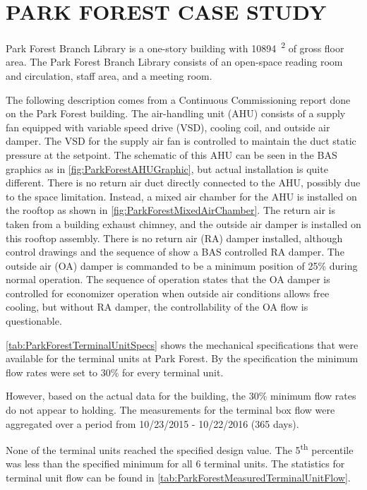 \chapter{\texorpdfstring{\MakeUppercase{Park Forest Case Study}}{Park Forest Case Study}}

Park Forest Branch Library is a one-story building with
\SI{10894}{\feet\squared} of gross floor area. The Park Forest Branch
Library consists of an open-space reading room and circulation, staff
area, and a meeting room.

The following description comes from a Continuous Commissioning report
done on the Park Forest building. The air-handling unit (AHU) consists
of a supply fan equipped with variable speed drive (VSD), cooling coil,
and outside air damper. The VSD for the supply air fan is controlled to
maintain the duct static pressure at the setpoint. The schematic of this AHU can
be seen in the BAS graphics as in \figref{}
\ref{fig:ParkForestAHUGraphic}, but actual installation is
quite different. There is no return air duct directly connected to the
AHU, possibly due to the space limitation. Instead, a mixed air chamber
for the AHU is installed on the rooftop as shown in \figref{}
\ref{fig:ParkForestMixedAirChamber}. The return
air is taken from a building exhaust chimney, and the outside air damper
is installed on this rooftop assembly. There is no return air (RA)
damper installed, although control drawings and the sequence of show a
BAS controlled RA damper. The outside air (OA) damper is commanded to be
a minimum position of 25\% during normal operation. The sequence of
operation states that the OA damper is controlled for economizer
operation when outside air conditions allows free cooling, but without
RA damper, the controllability of the OA flow is questionable.

\tableref{} \ref{tab:ParkForestTerminalUnitSpecs} shows the
mechanical specifications that were available for the terminal units at
Park Forest. By the specification the minimum flow rates were set to
30\% for every terminal unit. 

However, based on the actual data for the building, the 30\% minimum
flow rates do not appear to holding. The measurements for the terminal
box flow were aggregated over a period from 10/23/2015 - 10/22/2016
(365 days). 

None of the terminal units reached the specified design value. The
5\textsuperscript{th} percentile was less than the specified minimum for
all 6 terminal units. The statistics for terminal unit flow can be found in 
\tableref{} \ref{tab:ParkForestMeasuredTerminalUnitFlow}. 



